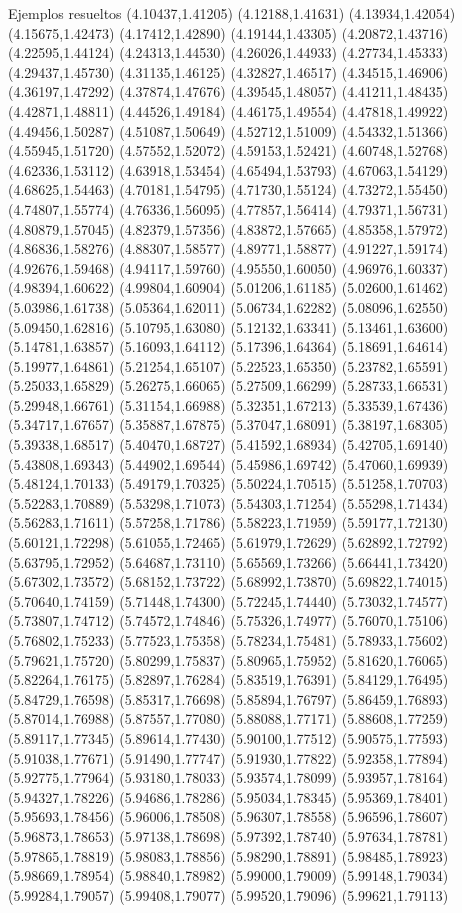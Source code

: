 \documentclass[11pt,a4paper]{article}
\begin{document}
\begin{fmex}{Ejemplos resueltos}
(4.10437,1.41205) (4.12188,1.41631) (4.13934,1.42054) (4.15675,1.42473) (4.17412,1.42890) (4.19144,1.43305) (4.20872,1.43716) (4.22595,1.44124) (4.24313,1.44530) (4.26026,1.44933) (4.27734,1.45333) (4.29437,1.45730) (4.31135,1.46125) (4.32827,1.46517) (4.34515,1.46906) (4.36197,1.47292) (4.37874,1.47676) (4.39545,1.48057) (4.41211,1.48435) (4.42871,1.48811) (4.44526,1.49184) (4.46175,1.49554) (4.47818,1.49922) (4.49456,1.50287) (4.51087,1.50649) (4.52712,1.51009) (4.54332,1.51366) (4.55945,1.51720) (4.57552,1.52072) (4.59153,1.52421) (4.60748,1.52768) (4.62336,1.53112) (4.63918,1.53454) (4.65494,1.53793) (4.67063,1.54129) (4.68625,1.54463) (4.70181,1.54795) (4.71730,1.55124) (4.73272,1.55450) (4.74807,1.55774) (4.76336,1.56095) (4.77857,1.56414) (4.79371,1.56731) (4.80879,1.57045) (4.82379,1.57356) (4.83872,1.57665) (4.85358,1.57972) (4.86836,1.58276) (4.88307,1.58577) (4.89771,1.58877) (4.91227,1.59174) (4.92676,1.59468) (4.94117,1.59760) (4.95550,1.60050) (4.96976,1.60337) (4.98394,1.60622) (4.99804,1.60904) (5.01206,1.61185) (5.02600,1.61462) (5.03986,1.61738) (5.05364,1.62011) (5.06734,1.62282) (5.08096,1.62550) (5.09450,1.62816) (5.10795,1.63080) (5.12132,1.63341) (5.13461,1.63600) (5.14781,1.63857) (5.16093,1.64112) (5.17396,1.64364) (5.18691,1.64614) (5.19977,1.64861) (5.21254,1.65107) (5.22523,1.65350) (5.23782,1.65591) (5.25033,1.65829) (5.26275,1.66065) (5.27509,1.66299) (5.28733,1.66531) (5.29948,1.66761) (5.31154,1.66988) (5.32351,1.67213) (5.33539,1.67436) (5.34717,1.67657) (5.35887,1.67875) (5.37047,1.68091) (5.38197,1.68305) (5.39338,1.68517) (5.40470,1.68727) (5.41592,1.68934) (5.42705,1.69140) (5.43808,1.69343) (5.44902,1.69544) (5.45986,1.69742) (5.47060,1.69939) (5.48124,1.70133) (5.49179,1.70325) (5.50224,1.70515) (5.51258,1.70703) (5.52283,1.70889) (5.53298,1.71073) (5.54303,1.71254) (5.55298,1.71434) (5.56283,1.71611) (5.57258,1.71786) (5.58223,1.71959) (5.59177,1.72130) (5.60121,1.72298) (5.61055,1.72465) (5.61979,1.72629) (5.62892,1.72792) (5.63795,1.72952) (5.64687,1.73110) (5.65569,1.73266) (5.66441,1.73420) (5.67302,1.73572) (5.68152,1.73722) (5.68992,1.73870) (5.69822,1.74015) (5.70640,1.74159) (5.71448,1.74300) (5.72245,1.74440) (5.73032,1.74577) (5.73807,1.74712) (5.74572,1.74846) (5.75326,1.74977) (5.76070,1.75106) (5.76802,1.75233) (5.77523,1.75358) (5.78234,1.75481) (5.78933,1.75602) (5.79621,1.75720) (5.80299,1.75837) (5.80965,1.75952) (5.81620,1.76065) (5.82264,1.76175) (5.82897,1.76284) (5.83519,1.76391) (5.84129,1.76495) (5.84729,1.76598) (5.85317,1.76698) (5.85894,1.76797) (5.86459,1.76893) (5.87014,1.76988) (5.87557,1.77080) (5.88088,1.77171) (5.88608,1.77259) (5.89117,1.77345) (5.89614,1.77430) (5.90100,1.77512) (5.90575,1.77593) (5.91038,1.77671) (5.91490,1.77747) (5.91930,1.77822) (5.92358,1.77894) (5.92775,1.77964) (5.93180,1.78033) (5.93574,1.78099) (5.93957,1.78164) (5.94327,1.78226) (5.94686,1.78286) (5.95034,1.78345) (5.95369,1.78401) (5.95693,1.78456) (5.96006,1.78508) (5.96307,1.78558) (5.96596,1.78607) (5.96873,1.78653) (5.97138,1.78698) (5.97392,1.78740) (5.97634,1.78781) (5.97865,1.78819) (5.98083,1.78856) (5.98290,1.78891) (5.98485,1.78923) (5.98669,1.78954) (5.98840,1.78982) (5.99000,1.79009) (5.99148,1.79034) (5.99284,1.79057) (5.99408,1.79077) (5.99520,1.79096) (5.99621,1.79113) 
\end{fmex}
\end{document}
